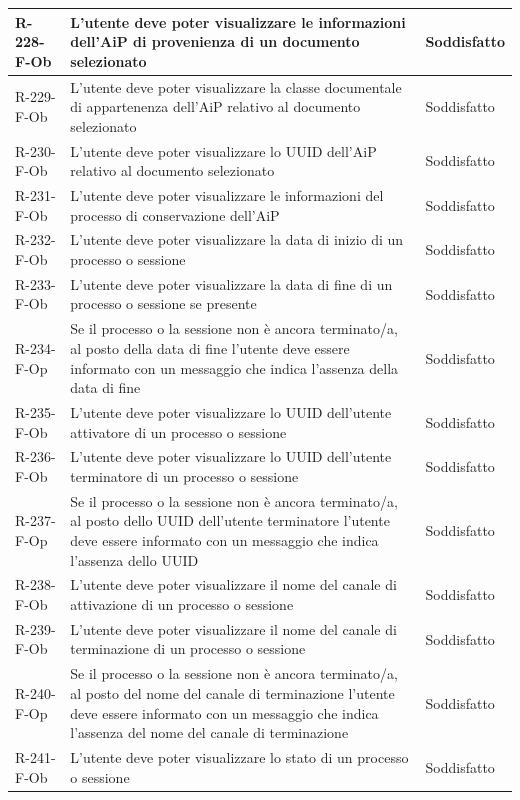 \begin{longtable}{|p{2.5cm}|p{9.5cm}|p{2.5cm}|}
\hline
R-228-F-Ob & L'utente deve poter visualizzare le informazioni dell'AiP di provenienza di un documento selezionato & Soddisfatto \\
\hline
R-229-F-Ob & L'utente deve poter visualizzare la classe documentale di appartenenza dell'AiP relativo al documento selezionato & Soddisfatto \\
\hline
R-230-F-Ob & L'utente deve poter visualizzare lo UUID dell'AiP relativo al documento selezionato & Soddisfatto \\
\hline
R-231-F-Ob & L'utente deve poter visualizzare le informazioni del processo di conservazione dell'AiP & Soddisfatto \\
\hline
R-232-F-Ob & L'utente deve poter visualizzare la data di inizio di un processo o sessione & Soddisfatto \\
\hline
R-233-F-Ob & L'utente deve poter visualizzare la data di fine di un processo o sessione se presente & Soddisfatto \\
\hline
R-234-F-Op & Se il processo o la sessione non è ancora terminato/a, al posto della data di fine l'utente deve essere informato con un messaggio che indica l'assenza della data di fine & Soddisfatto \\
\hline
R-235-F-Ob & L'utente deve poter visualizzare lo UUID dell'utente attivatore di un processo o sessione & Soddisfatto \\
\hline
R-236-F-Ob & L'utente deve poter visualizzare lo UUID dell'utente terminatore di un processo o sessione & Soddisfatto \\
\hline
R-237-F-Op & Se il processo o la sessione non è ancora terminato/a, al posto dello UUID dell'utente terminatore l'utente deve essere informato con un messaggio che indica l'assenza dello UUID & Soddisfatto \\
\hline
R-238-F-Ob & L'utente deve poter visualizzare il nome del canale di attivazione di un processo o sessione & Soddisfatto \\
\hline
R-239-F-Ob & L'utente deve poter visualizzare il nome del canale di terminazione di un processo o sessione & Soddisfatto \\
\hline
R-240-F-Op & Se il processo o la sessione non è ancora terminato/a, al posto del nome del canale di terminazione l'utente deve essere informato con un messaggio che indica l'assenza del nome del canale di terminazione & Soddisfatto \\
\hline
R-241-F-Ob & L'utente deve poter visualizzare lo stato di un processo o sessione & Soddisfatto \\

\end{longtable}
